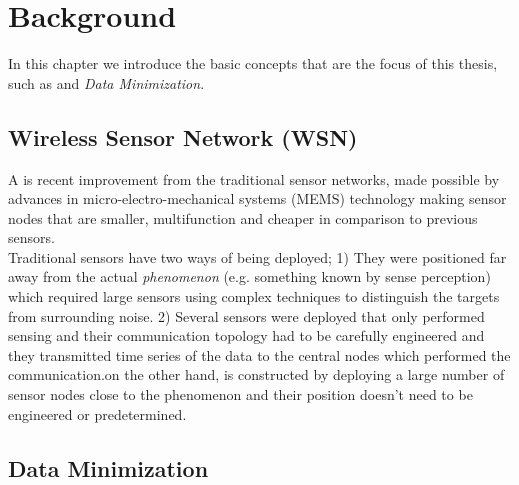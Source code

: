 \chapter{Background}

In this chapter we introduce the basic concepts that are the focus of this thesis, such as \wsns and \textit{Data Minimization}. %


\section{Wireless Sensor Network (WSN)}



A \wsn is recent improvement from the traditional sensor networks, made possible by advances in micro-electro-mechanical systems (MEMS) technology making sensor nodes that are smaller, multifunction and cheaper in comparison to previous sensors. \\

Traditional sensors have two ways of being deployed; 1) They were positioned far away from the actual \textit{phenomenon} (e.g. something known by sense perception) which required large sensors using complex techniques to distinguish the targets from surrounding noise. 2) Several sensors were deployed that only performed sensing and their communication topology had to be carefully engineered and they transmitted time series of the data to the central nodes which performed the communication.\wsns on the other hand, is constructed by deploying a large number of sensor nodes close to the phenomenon and their position doesn't need to be engineered or predetermined.\cite{wsnsurvey} 


\section{Data Minimization}


